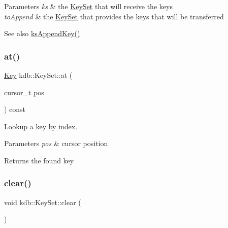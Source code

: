 \begin{DoxyParams}{Parameters}
{\em ks} & the \mbox{\hyperlink{classkdb_1_1KeySet}{Key\+Set}} that will receive the keys \\
\hline
{\em to\+Append} & the \mbox{\hyperlink{classkdb_1_1KeySet}{Key\+Set}} that provides the keys that will be transferred \\
\hline
\end{DoxyParams}
\begin{DoxySeeAlso}{See also}
\mbox{\hyperlink{group__keyset_gaa5a1d467a4d71041edce68ea7748ce45}{ks\+Append\+Key()}} 
\end{DoxySeeAlso}
\mbox{\label{classkdb_1_1KeySet_ab2821dd5568636f5e789e49562c7da21}} 
\subsubsection{\texorpdfstring{at()}{at()}}
{\footnotesize\ttfamily \mbox{\hyperlink{classkdb_1_1Key}{Key}} kdb\+::\+Key\+Set\+::at (\begin{DoxyParamCaption}\item[{cursor\+\_\+t}]{pos }\end{DoxyParamCaption}) const\hspace{0.3cm}{\ttfamily [inline]}}



Lookup a key by index. 


\begin{DoxyParams}{Parameters}
{\em pos} & cursor position\\
\hline
\end{DoxyParams}
\begin{DoxyReturn}{Returns}
the found key 
\end{DoxyReturn}
\mbox{\label{classkdb_1_1KeySet_a38f5159e39758aa632421d2fe7440633}} 
\subsubsection{\texorpdfstring{clear()}{clear()}}
{\footnotesize\ttfamily void kdb\+::\+Key\+Set\+::clear (\begin{DoxyParamCaption}{ }\end{DoxyParamCaption})\hspace{0.3cm}{\ttfamily [inline]}}



